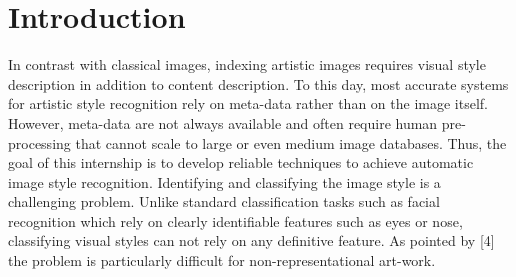\newpage
\section{Introduction}
In contrast with classical images, indexing artistic images	requires visual style description in addition to content description.
To this day, most accurate systems for artistic style recognition rely on meta-data rather than on the image
itself. However, meta-data are not always available and often require human pre-processing that cannot scale
to large or even medium image databases. Thus, the goal of this internship is to develop reliable techniques to
achieve automatic image style recognition.
Identifying and classifying the image style is a challenging problem. Unlike standard classification tasks such as facial recognition which rely on clearly identifiable features such as eyes or nose, classifying visual styles can not rely on any definitive feature. As pointed by [4] the problem is particularly difficult for non-representational art-work.